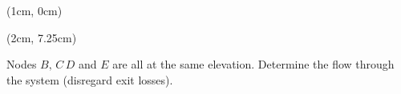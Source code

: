 \documentclass[9pt,xcolor={svgnames, x11names},mathpazo, professionalfonts]{beamer}
\begin{document}
\begin{frame}
	\begin{textblock*}{1\textwidth}(1cm, 0cm)
		
		\vspace{-0.5cm}
		
	\end{textblock*}
	
	\begin{textblock*}{0.8\textwidth}(2cm, 7.25cm)
		
		\begin{myexer}{}{}
			Nodes $B,\,C\, D$ and $E$ are all at the same elevation. Determine the flow through the system (disregard exit losses).
		\end{myexer}
		
	\end{textblock*}
	

\end{frame}
\end{document}
